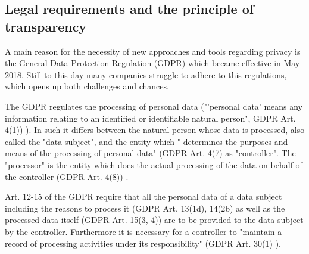 \subsection{Legal requirements and the principle of transparency}


A main reason for the necessity of new approaches and tools regarding privacy is the General Data Protection Regulation (GDPR) which became effective in May 2018. Still to this day many companies struggle to adhere to this regulations, which opens up both challenges and chances.

The GDPR regulates the processing of personal data ("'personal data' means any information relating to an identified or identifiable natural person", GDPR Art. 4(1)) \cite{EuropeanParliamentandoftheCouncil3026GeneralRegulation}). In such it differs between the natural person whose data is processed, also called the "data subject", and the entity which " determines the purposes and means of the processing of personal data" (GDPR Art. 4(7) \cite{EuropeanParliamentandoftheCouncil3026GeneralRegulation} as "controller". The "processor" is the entity which does the actual processing of the 
data on behalf of the controller (GDPR Art. 4(8)) \cite{EuropeanParliamentandoftheCouncil3026GeneralRegulation}.

Art. 12-15 of the GDPR require that all the personal data of a data subject including the reasons to process it (GDPR Art. 13(1d), 14(2b) as well as the processed data itself (GDPR Art. 15(3, 4)\cite{EuropeanParliamentandoftheCouncil3026GeneralRegulation}) are to be provided to the data subject by the controller. Furthermore it is necessary for a controller to "maintain a record of processing activities under its responsibility" (GDPR Art. 30(1) \cite{EuropeanParliamentandoftheCouncil3026GeneralRegulation}).

